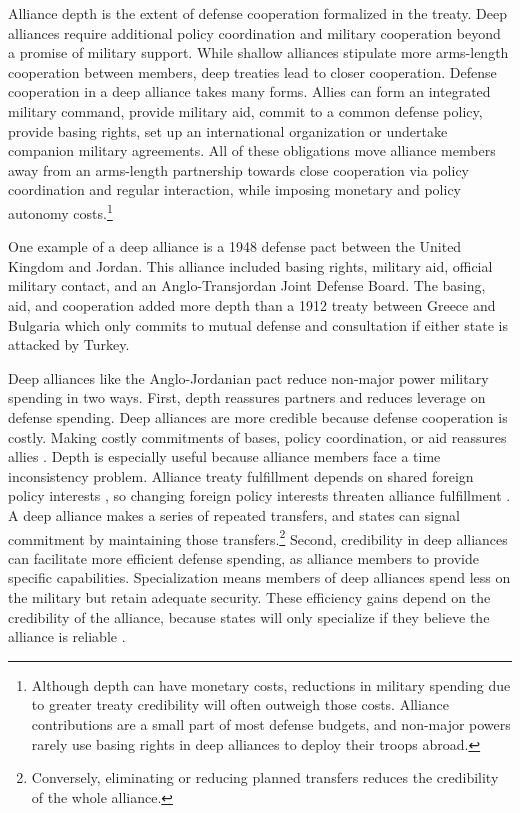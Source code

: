 \documentclass[12pt]{article}
\begin{document}
Alliance depth is the extent of defense cooperation formalized in the treaty. 
Deep alliances require additional policy coordination and military cooperation beyond a promise of military support. 
While shallow alliances stipulate more arms-length cooperation between members, deep treaties lead to closer cooperation. 
Defense cooperation in a deep alliance takes many forms. 
Allies can form an integrated military command, provide military aid, commit to a common defense policy, provide basing rights, set up an international organization or undertake companion military agreements. 
All of these obligations move alliance members away from an arms-length partnership towards close cooperation via policy coordination and regular interaction, while imposing monetary and policy autonomy costs.\footnote{Although depth can have monetary costs, reductions in military spending due to greater treaty credibility will often outweigh those costs. Alliance contributions are a small part of most defense budgets, and non-major powers rarely use basing rights in deep alliances to deploy their troops abroad.} 

 
One example of a deep alliance is a 1948 defense pact between the United Kingdom and Jordan.
This alliance included basing rights, military aid, official military contact, and an Anglo-Transjordan Joint Defense Board.  
The basing, aid, and cooperation added more depth than a 1912 treaty between Greece and Bulgaria which only commits to mutual defense and consultation if either state is attacked by Turkey. 


Deep alliances like the Anglo-Jordanian pact reduce non-major power military spending in two ways. 
First, depth reassures partners and reduces leverage on defense spending.  
Deep alliances are more credible because defense cooperation is costly. 
Making costly commitments of bases, policy coordination, or aid reassures allies \citep{Morrow1994}. 
Depth is especially useful because alliance members face a time inconsistency problem. 
Alliance treaty fulfillment depends on shared foreign policy interests \citep{Morrow2000, Leeds2003a}, so changing foreign policy interests threaten alliance fulfillment \citep{LeedsSavun2007}. 
A deep alliance makes a series of repeated transfers, and states can signal commitment by maintaining those transfers.\footnote{Conversely, eliminating or reducing planned transfers reduces the credibility of the whole alliance.} 
Second, credibility in deep alliances can facilitate more efficient defense spending, as alliance members to provide specific capabilities. 
Specialization means members of deep alliances spend less on the military but retain adequate security.
These efficiency gains depend on the credibility of the alliance, because states will only specialize if they believe the alliance is reliable \citep{Leeds2003a}.  
\end{document}
